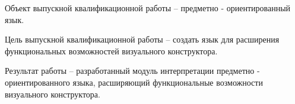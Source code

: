 Объект выпускной квалификационной работы -- предметно - ориентированный язык.

Цель выпускной квалификационной работы -- создать язык для расширения функциональных возможностей визуального конструктора.

Результат работы -- разработанный модуль интерпретации предметно - ориентированного языка, расширяющий функциональные возможности
визуального конструктора.